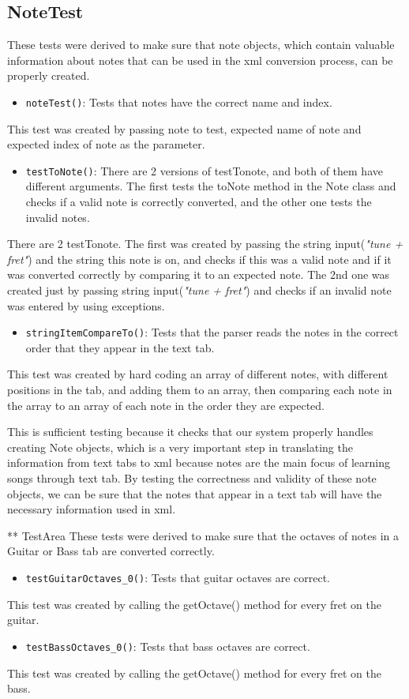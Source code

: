 \documentclass[11pt]{article}
\begin{document}
\subsection{NoteTest}
\label{sec:org888a62d}
These tests were derived to make sure that note objects, which contain valuable information about notes that can be used in the xml conversion process, can be properly created. 
\begin{itemize}
\item \texttt{noteTest()}: Tests that notes have the correct name and index.
\end{itemize}
This test was created by passing note to test, expected name of note and expected index of note as the parameter.
\begin{itemize}
\item \texttt{testToNote()}: There are 2 versions of testTonote, and both of them have different arguments. The first tests the toNote method in the Note class and checks if a valid note is correctly converted, and the other one tests the invalid notes.
\end{itemize}
There are 2 testTonote. The first was created by passing the string input(\emph{"tune + fret"}) and the string this note is on, and checks if this was a valid note and if it was converted correctly by comparing it to an expected note. The 2nd one was created just by passing string input(\emph{"tune + fret"}) and checks if an invalid note was entered by using exceptions.
\begin{itemize}
\item \texttt{stringItemCompareTo()}: Tests that the parser reads the notes in the correct order that they appear in the text tab.
\end{itemize}
This test was created by hard coding an array of different notes, with different positions in the tab, and adding them to an array, then comparing each note in the array to an array of each note in the order they are expected.

This is sufficient testing because it checks that our system properly handles creating Note objects, which is a very important step in translating the information from text tabs to xml because notes are the main focus of learning songs through text tab. By testing the correctness and validity of these note objects, we can be sure that the notes that appear in a text tab will have the necessary information used in xml.

** TestArea
These tests were derived to make sure that the octaves of notes in a Guitar or Bass tab are converted correctly.
\begin{itemize}
\item \texttt{testGuitarOctaves\_0()}: Tests that guitar octaves are correct.
\end{itemize}
This test was created by calling the getOctave() method for every fret on the guitar.
\begin{itemize}
\item \texttt{testBassOctaves\_0()}: Tests that bass octaves are correct.
\end{itemize}
This test was created by calling the getOctave() method for every fret on the bass.
\end{document}
